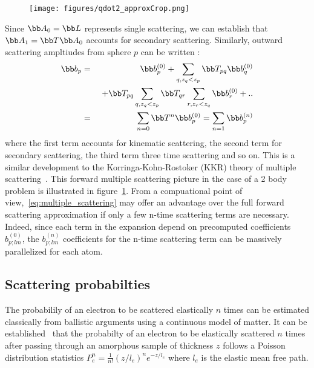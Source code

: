 \begin{figure}[h!]
  \centering
  \texttt{[image: figures/qdot2\_approxCrop.png]}
\label{fig:qdot2_approx}
\end{figure}


Since $\bb A_0=\bb L$ represents single scattering, we can establish that
$\bb A_1=\bb T\bb A_0$ accounts for secondary scattering.
Similarly, outward scattering ampltiudes from sphere $p$ can be written :
%
\begin{eqnarray}
  \bb b_{p} &=&
      \bb b_{p}^{(0)} + \sum_{q,z_q<z_p}\bb T_{pq}\bb b_{q}^{(0)}  \nonumber\\
    &&~+\bb T_{pq}\sum_{q,z_q<z_p}\bb T_{qr}\sum_{r,z_r<z_q}\bb b_{r}^{(0)} + ..\nonumber\\
    &=& \sum_{n=0} \bb T^n \bb b_p^{(0)} = \sum_{n=1}\bb b_p^{(n)}  \label{eq:multiple_scattering}
\end{eqnarray}
%
where the first term accounts for kinematic scattering, the second term for
secondary scattering, the third term three time scattering and so on.
This is a similar development to the Korringa-Kohn-Rostoker (KKR) theory of
multiple scattering~\cite{Korringa1947,Kohn1954,Korringa1994}.
This forward multiple scattering picture in the case of a 2 body problem is
illustrated in figure~\ref{fig:qdot2_approx}.
From a compuational point of view,~\eqref{eq:multiple_scattering} may offer an
advantage over the full forward scattering approximation if only a few n-time
scattering terms are necessary. Indeed, since each term in the expansion depend
on precomputed coefficients $b_{p;lm}^{(0)}$, the $b_{p;lm}^{(n)}$ coefficients
for the n-time scattering term can be massively parallelized for each atom.


\subsection{Scattering probabilties}

The probabilily of an electron to be scattered elastically $n$ times can be
estimated classically from ballistic arguments using a continuous model of matter.
It can be established~\cite{Egerton2011d} that the probabilty of an electron to
be elastically scattered $n$ times after passing through an amorphous sample of
thickness $z$ follows a Poisson distribution statistics
$P_e^n=\frac{1}{n!}(z/l_e)^ne^{-z/l_e}$
where $l_e$ is the elastic mean free path.

